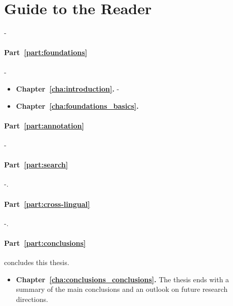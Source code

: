 \section{Guide to the Reader}

-

\paragraph{\textbf{Part~\ref{part:foundations}}} - 

\begin{itemize}
\item \textbf{Chapter~\ref{cha:introduction}.} -
\item \textbf{Chapter~\ref{cha:foundations_basics}.}
\end{itemize}

\paragraph{\textbf{Part~\ref{part:annotation}}} -



\paragraph{\textbf{Part~\ref{part:search}}} -.

\paragraph{\textbf{Part~\ref{part:cross-lingual}}} -.

\paragraph{\textbf{Part~\ref{part:conclusions}}} concludes this thesis.

\begin{itemize}
\item \textbf{Chapter~\ref{cha:conclusions_conclusions}.} The thesis ends with a summary of the main conclusions and an outlook on future research directions.
\end{itemize}

